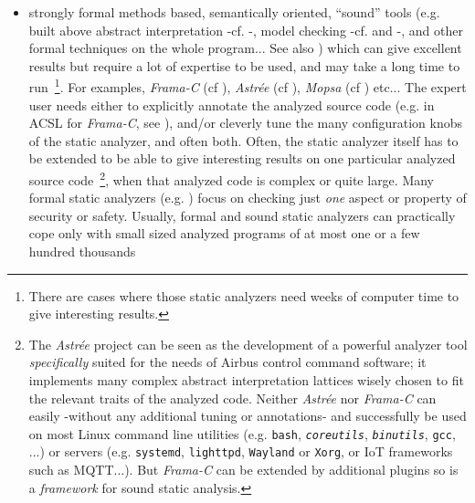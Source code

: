 \begin{itemize}
  \item strongly formal methods based, semantically oriented,
    ``sound'' tools (e.g. built above abstract interpretation -cf.
    \cite{Cousot:2014:AIP,CousotCousot77-1}-, model checking -cf.
    \cite{Schlich:2010:MCS, Siddiqui:2018:adv-soft-model-check} and
    \cite{Jhala:2009:SMC}-, and other formal techniques on the whole
    program... See also \cite{Andreasen:2017:SAI}) which can give
    excellent results but require a lot of expertise to be used, and
    may take a long time to run~\footnote{There are cases where those
      static analyzers need weeks of computer time to give interesting
      results.}. For examples, \emph{Frama-C} (cf
    \cite{Cuoq:2012:Frama-C}), \emph{Astrée} (cf
    \cite{Mine:2015:TIU}), \emph{Mopsa} (cf \cite{Mine:2018:Mopsa})
    etc... The expert  user needs
    either to explicitly annotate the analyzed source code (e.g. in
    ACSL for \emph{Frama-C}, see \cite{Baudin:2018:ACSL,
      Delahaye:2013:CSL, Amin:2017:LAW}), and/or cleverly tune the
    many configuration knobs of the static analyzer, and often
    both. Often, the static analyzer itself has to be extended to be
    able to give interesting results on one particular analyzed source
    code~\footnote{The \emph{Astrée} project can be seen as the
      development of a powerful analyzer tool \emph{specifically}
      suited for the needs of Airbus control command software; it
      implements many complex abstract interpretation lattices wisely
      chosen to fit the relevant traits of the analyzed code. Neither
      \emph{Astrée} nor \emph{Frama-C} can easily -without any
      additional tuning or annotations- and successfully be used on
      most Linux command line utilities (e.g. \texttt{bash},
      \texttt{\emph{coreutils}}, \texttt{\emph{binutils}},
      \texttt{gcc}, ...)  or servers (e.g. \texttt{systemd},
      \texttt{lighttpd}, \texttt{Wayland} or \texttt{Xorg}, or IoT
      frameworks such as MQTT...). But \emph{Frama-C} can be extended
      by additional plugins so is a \emph{framework} for sound static
      analysis.}, when that analyzed code is complex or quite
    large. Many formal static analyzers
    (e.g. \cite{Greenaway:2014:DSS, Vedala:2012:ADP}) focus on
    checking just \emph{one} aspect or property of security or
    safety. Usually, formal and sound static analyzers can practically
    cope only with small
    sized analyzed programs of at most one or a few hundred thousands

\end{itemize}
